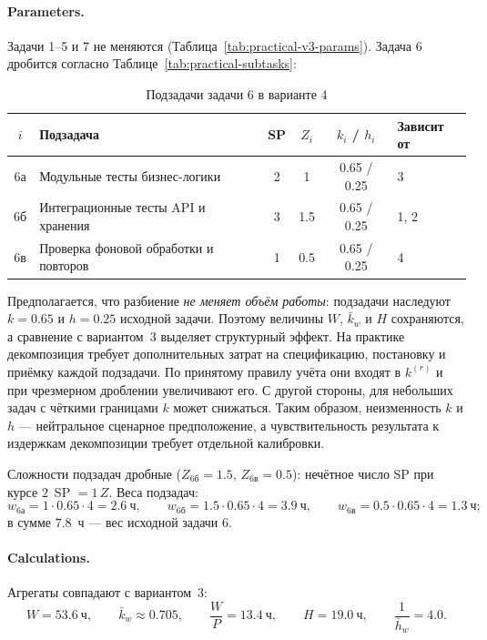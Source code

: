 \documentclass[12pt,a4paper]{article}
\theoremstyle{definition}
\begin{document}
\paragraph{Parameters.}
Задачи 1--5 и 7 не меняются (Таблица~\ref{tab:practical-v3-params}). Задача 6 дробится согласно Таблице~\ref{tab:practical-subtasks}:

\begin{table}[ht!]
\centering
\caption{Подзадачи задачи 6 в варианте 4}
\label{tab:practical-v4-params}
\begin{tabular}{clcccl}
\toprule
$i$ & Подзадача & SP & $Z_i$ & $k_i$ / $h_i$ & Зависит от \\
\midrule
6а & Модульные тесты бизнес-логики & 2 & 1 & 0.65 / 0.25 & 3 \\
6б & Интеграционные тесты API и хранения & 3 & 1.5 & 0.65 / 0.25 & 1, 2 \\
6в & Проверка фоновой обработки и повторов & 1 & 0.5 & 0.65 / 0.25 & 4 \\
\bottomrule
\end{tabular}
\end{table}

Предполагается, что разбиение \emph{не меняет объём работы}: подзадачи наследуют $k = 0.65$ и $h = 0.25$ исходной задачи. Поэтому величины $W$, $\bar{k}_w$ и $H$ сохраняются, а сравнение с вариантом~3 выделяет структурный эффект. На практике декомпозиция требует дополнительных затрат на спецификацию, постановку и приёмку каждой подзадачи. По принятому правилу учёта они входят в $k^{(r)}$ и при чрезмерном дроблении увеличивают его. С другой стороны, для небольших задач с чёткими границами $k$ может снижаться. Таким образом, неизменность $k$ и $h$ --- нейтральное сценарное предположение, а чувствительность результата к издержкам декомпозиции требует отдельной калибровки.

Сложности подзадач дробные ($Z_{6\text{б}} = 1.5$, $Z_{6\text{в}} = 0.5$): нечётное число SP при курсе $2$~SP $= 1\,Z$. Веса подзадач:
\[
  w_{6\text{а}} = 1 \cdot 0.65 \cdot 4 = 2.6~\text{ч}, \qquad
  w_{6\text{б}} = 1.5 \cdot 0.65 \cdot 4 = 3.9~\text{ч}, \qquad
  w_{6\text{в}} = 0.5 \cdot 0.65 \cdot 4 = 1.3~\text{ч};
\]
в сумме $7.8$~ч --- вес исходной задачи 6.

\paragraph{Calculations.}
Агрегаты совпадают с вариантом~3:
\[
  W = 53.6~\text{ч}, \qquad
  \bar{k}_w \approx 0.705, \qquad
  \frac{W}{P} = 13.4~\text{ч}, \qquad
  H = 19.0~\text{ч}, \qquad
  \frac{1}{\bar{h}_w} = 4.0.
\]
\end{document}
